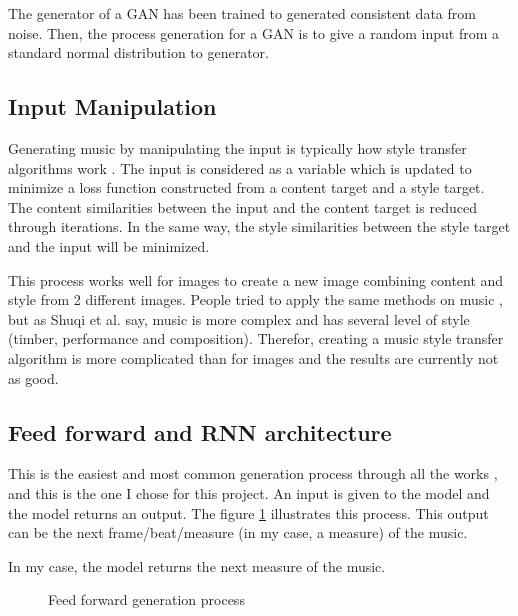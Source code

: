 \documentclass[12pt]{report}
\begin{document}
The generator of a GAN has been trained to generated consistent data from noise.
Then, the process generation for a GAN is to give a random input from a standard normal distribution to generator.

\subsection{Input Manipulation}

Generating music by manipulating the input is typically how style transfer algorithms work \cite{shetty_neural_2019, gatys_neural_2015, li_universal_2017}.
The input is considered as a variable which is updated to minimize a loss function constructed from a content target and a style target.
The content similarities between the input and the content target is reduced through iterations.
In the same way, the style similarities between the style target and the input will be minimized.

This process works well for images to create a new image combining content and style from 2 different images.
People tried to apply the same methods on music \cite{kaliakatsos-papakostas_conceptual_2017, hung_musical_2019, brunner_symbolic_2018, lu_play_2018}, but as Shuqi et al. \cite{dai_music_2018} say, music is more complex and has several level of style (timber, performance and composition).
Therefor, creating a music style transfer algorithm is more complicated than for images and the results are currently not as good.

\subsection{Feed forward and RNN architecture}
\label{sec:rw:feed-forward}

This is the easiest and most common generation process through all the works \cite{liang_automatic_2017, chuan_modeling_nodate, huang_counterpoint_2017, wu_hierarchical_2018}, and this is the one I chose for this project.
An input is given to the model and the model returns an output.
The figure \ref{fig:feed_forward_generation_process} illustrates this process.
This output can be the next frame/beat/measure (in my case, a measure) of the music.

In my case, the model returns the next measure of the music.

\begin{figure}[h]
\begin{center}
\caption{Feed forward generation process}
\label{fig:feed_forward_generation_process}
\end{center}
\end{figure}
\end{document}
